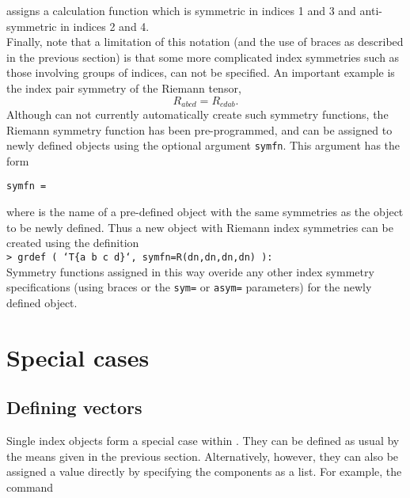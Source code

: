 \documentclass{article}
\begin{document}
\noindent assigns a calculation function which is symmetric in indices
1 and 3 and anti-symmetric in indices 2 and 4.\\

Finally, note that a limitation of this notation (and the use of braces
as described in the previous section) is that some more complicated index
symmetries such as those involving groups of indices, can not be
specified. An important example is the index pair symmetry of the
Riemann tensor,
\[
  R_{abcd} = R_{cdab}.
\]
Although  can not currently automatically create such
symmetry functions, the Riemann symmetry function has been pre-programmed,
and can be assigned to newly defined objects using the optional argument
\texttt{symfn}. This argument has the form
\begin{center}
  \texttt{symfn = }
\end{center}
where  is the name of a pre-defined object with the
same symmetries as the object to be newly defined. Thus a new object
with Riemann index symmetries can be created using the definition\\

\noindent\texttt{> grdef ( `T\{a b c d\}`, symfn=R(dn,dn,dn,dn) ):}\\

\noindent Symmetry functions assigned in this way overide any other
index symmetry specifications (using braces or the \texttt{sym=} or
\texttt{asym=} parameters) for the newly defined object.
%
\section{Special cases}
%
\subsection*{Defining vectors}
%
Single index objects form a special case within . They can
be defined as usual by the means given in the previous section. Alternatively,
however, they can also be assigned a value directly by specifying the
components as a list. For example, the command\\
\end{document}
